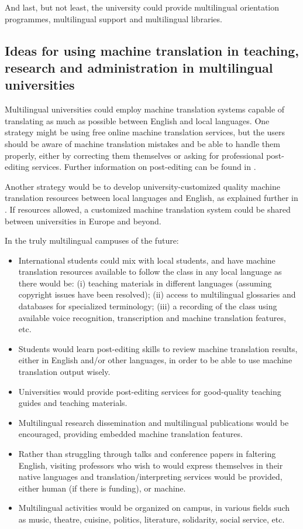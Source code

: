 \documentclass[output=paper]{langscibook}
\begin{document}
And last, but not least, the university could provide multilingual orientation programmes, multilingual support and multilingual libraries. 



\subsection{Ideas for using machine translation in teaching, research and administration in multilingual universities}

Multilingual universities could employ machine translation systems capable of translating as much as possible between English and local languages. One strategy might be using free online machine translation services, but the users should be aware of machine translation mistakes and be able to handle them properly, either by correcting them themselves or asking for professional post-editing services. Further information on post-editing can be found in . 

Another strategy would be to develop university-customized quality machine translation resources between local languages and English, as explained further in . If resources allowed, a customized machine translation system could be shared between universities in Europe and beyond.

In the truly multilingual campuses of the future: 

\begin{itemize}
\item International students could mix with local students, and have machine translation resources available to follow the class in any local language as there would be: (i) teaching materials in different languages (assuming copyright issues have been resolved); (ii) access to multilingual glossaries and databases for specialized terminology; (iii) a recording of the class using available voice recognition, transcription and machine translation features, etc.
\end{itemize}
\begin{itemize}
\item Students would learn post-editing skills to review machine translation results, either in English and/or other languages, in order to be able to use machine translation output wisely.
\item Universities would provide post-editing services for good-quality teaching guides and teaching materials.
\item Multilingual research dissemination and multilingual publications would be encouraged, providing embedded machine translation features.
\item Rather than struggling through talks and conference papers in faltering English, visiting professors who wish to would express themselves in their native languages and translation/interpreting services would be provided, either human (if there is funding), or machine.
\item Multilingual activities would be organized on campus, in various fields such as music, theatre, cuisine, politics, literature, solidarity, social service, etc.
\end{itemize}
\end{document}
